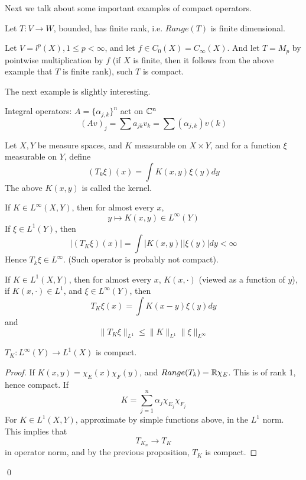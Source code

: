 Next we talk about some important examples of compact operators.
\begin{example}
    Let $T:V\to W$, bounded, has finite rank, i.e. $Range(T)$ is finite dimensional.
\end{example}
\begin{example}
    Let $V=l^p(X), 1\leq p<\infty$, and let $f\in C_0(X)=C_\infty(X)$. And let $T=M_p$ by pointwise multiplication by $f$ (if $X$ is finite, then it follows from the above example that $T$ is finite rank), such $T$ is compact.
\end{example}
The next example is slightly interesting.
\begin{example}
    Integral operators: $A=\{\alpha_{j,k}\}^n$ act on $\mathbb{C}^n$
    \begin{equation*}
        (Av)_j=\sum a_{jk}v_k=\sum (\alpha_{j,k})v(k)
    \end{equation*} 
\end{example}
Let $X,Y$ be measure spaces, and $K$ measurable on $X\times Y$, and for a function $\xi$ measurable on $Y$, define 
\begin{equation*}
    (T_k\xi)(x)=\int K(x,y)\xi(y)dy
\end{equation*}
The above $K(x,y)$ is called the kernel. 
\begin{example}
    If $K\in L^\infty(X,Y)$, then for almost every $x$,
    \begin{equation*}
        y\mapsto K(x,y)\in L^\infty(Y)
    \end{equation*}
    If $\xi\in L^1(Y)$, then 
    \begin{equation*}
        |(T_K\xi)(x)|=\int |K(x,y)||\xi(y)|dy<\infty
    \end{equation*}
    Hence $T_k\xi\in L^\infty$. (Such operator is probably not compact).
\end{example}

If $K\in L^1(X,Y)$, then for almost every $x$, $K(x,\cdot)$ (viewed as a function of $y$), if $K(x,\cdot)\in L^1$, and $\xi\in L^\infty(Y)$, then 
\begin{equation*}
    T_K\xi(x)=\int K(x-y)\xi(y)dy
\end{equation*}
and 
\begin{equation*}
    \|T_K\xi\|_{L^1}\leq \|K\|_{L^1}\|\xi\|_{L^\infty}
\end{equation*}
\begin{proposition}
    $T_K: L^\infty(Y)\to L^1(X)$ is compact.
\end{proposition}
\begin{proof}
    If $K(x,y)=\chi_E(x)\chi_F(y)$, and $Range(T_k)=\mathbb{R}\chi_E$. This is of rank 1, hence compact. If 
    \begin{equation*}
        K=\sum_{j=1}^n \alpha_j\chi_{E_j}\chi_{F_j}
    \end{equation*}
For $K\in L^1(X,Y)$, approximate by simple functions above, in the $L^1$ norm. This implies that 
\begin{equation*}
    T_{K_n}\to T_K
\end{equation*}
in operator norm, and by the previous proposition, $T_K$ is compact.
\end{proof}
\qed

